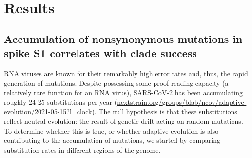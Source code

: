 \documentclass[11pt,oneside,letterpaper]{article}
\begin{document}
\section*{Results}
\subsection*{Accumulation of nonsynonymous mutations in spike S1 correlates with clade success}
RNA viruses are known for their remarkably high error rates and, thus, the rapid generation of mutations.
Despite possessing some proof-reading capacity (a relatively rare function for an RNA virus), SARS-CoV-2 has been accumulating roughly 24-25 substitutions per year (\href{https://nextstrain.org/groups/blab/ncov/adaptive-evolution/2021-05-15?l=clock}{nextstrain.org/groups/blab/ncov/adaptive-evolution/2021-05-15?l=clock}).
The null hypothesis is that these substitutions reflect neutral evolution: the result of genetic drift acting on random mutations.
To determine whether this is true, or whether adaptive evolution is also contributing to the accumulation of mutations, we started by comparing substitution rates in different regions of the genome.
\end{document}
